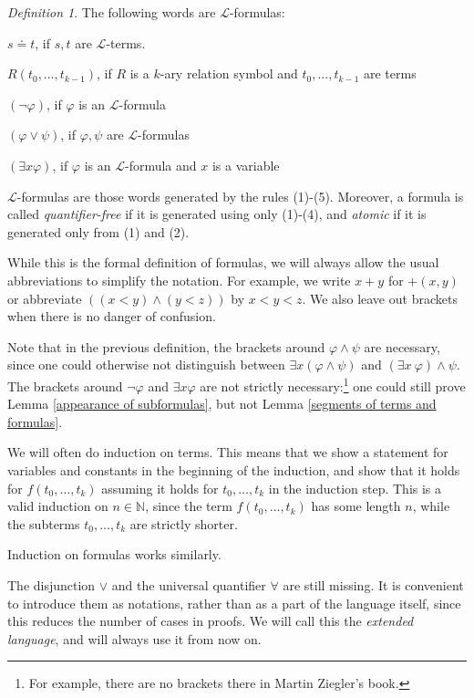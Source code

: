 \documentclass[a4paper, 11pt]{amsart}
\theoremstyle{remark}
\newtheorem{definition}[definition]{Definition}
\newcommand{\NN}{\mathbb{N}}
\newcommand{\cL}{\mathcal L}
\newenvironment{enumerate-(1)}{\begin{enumerate}[label={\upshape (\arabic*)}, leftmargin=2pc]}{\end{enumerate}}
\begin{document}
\begin{definition} 
The following words are $\cL$-formulas: 
\begin{enumerate-(1)} 
\item 
$s \doteq t$, if $s, t$ are $\cL$-terms. 
\item 
$R(t_0,\dots,t_{k-1})$, if $R$ is a $k$-ary relation symbol and $t_0,\dots,t_{k-1}$ are terms 
\item 
$(\neg \varphi)$, if $\varphi$ is an $\cL$-formula 
\item 
$(\varphi \vee \psi)$, if $\varphi, \psi$ are $\cL$-formulas 
\item 
$(\exists x \varphi)$, if $\varphi$ is an $\cL$-formula and $x$ is a variable 
\end{enumerate-(1)} 
$\cL$-formulas are those words generated by the rules (1)-(5). 
Moreover, a formula is called \emph{quantifier-free} if it is generated using only (1)-(4), and \emph{atomic} if it is generated only from (1) and (2). 
\end{definition} 

While this is the formal definition of formulas, we will always allow the usual abbreviations to simplify the notation. For example, we write $x+y$ for $+(x,y)$ or abbreviate $((x<y)\wedge (y<z))$ by $x<y<z$. 
We also leave out brackets when there is no danger of confusion. 
 
Note that in the previous definition, the brackets around $\varphi{\wedge} \psi$ are necessary, since one could otherwise not distinguish between $\exists x (\varphi \wedge \psi)$ and $(\exists x\ \varphi) \wedge \psi$. 
The brackets around $\neg \varphi$ and $\exists x \varphi$ are not strictly necessary:\footnote{For example, there are no brackets there in Martin Ziegler's book.} one could still prove Lemma \ref{appearance of subformulas}, but not Lemma \ref{segments of terms and formulas}. 


We will often do induction on terms. 
This means that we show a statement for variables and constants in the beginning of the induction, and show that it holds for $f(t_0,\dots,t_k)$ assuming it holds for $t_0,\dots,t_k$ in the induction step. 
This is a valid induction on $n\in \NN$, since the term $f(t_0,\dots,t_k)$ has some length $n$, while the subterms $t_0,\dots,t_k$ are strictly shorter. 

Induction on formulas works similarly. 


The disjunction $\vee$ and the universal quantifier $\forall$ are still missing. 
It is convenient to introduce them as notations, rather than as a part of the language itself, since this reduces the number of cases in proofs. 
We will call this the \emph{extended language}, and will always use it from now on. 
\end{document}
